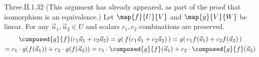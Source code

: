 \begin{ans}{Three.II.1.32}
      (This argument has already appeared, as part of the proof that
      isomorphism is an equivalence.)
      Let $\map{f}{U}{V}$ and $\map{g}{V}{W}$ be linear.
      For any $\vec{u}_1,\vec{u}_2\in U$ and scalars $c_1,c_2$ combinations
      are preserved.
      \begin{multline*}
        \composed{g}{f}(c_1\vec{u}_1+c_2\vec{u}_2)
        =g(\,f(c_1\vec{u}_1+c_2\vec{u}_2)\,)
        =g(\,c_1f(\vec{u}_1)+c_2f(\vec{u}_2)\,)              \\
        =c_1\cdot g(f(\vec{u}_1))+c_2\cdot g(f(\vec{u}_2))
        =c_1\cdot \composed{g}{f}(\vec{u}_1)
           +c_2\cdot \composed{g}{f}(\vec{u}_2)
      \end{multline*}
    
\end{ans}
